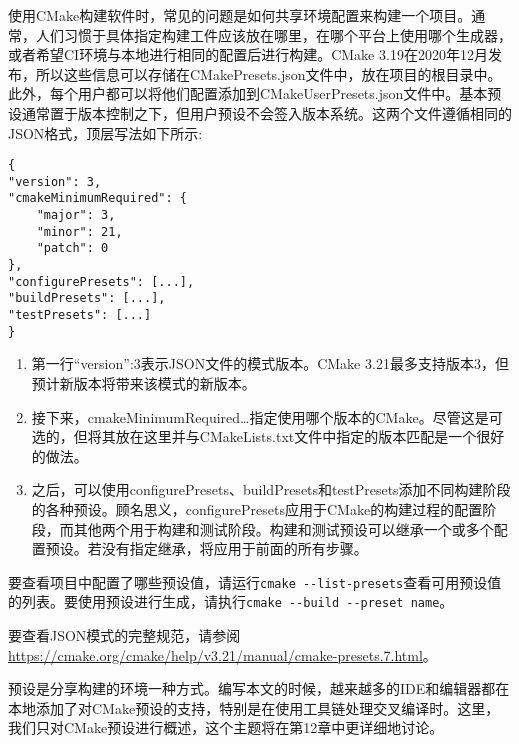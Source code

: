 使用CMake构建软件时，常见的问题是如何共享环境配置来构建一个项目。通常，人们习惯于具体指定构建工件应该放在哪里，在哪个平台上使用哪个生成器，或者希望CI环境与本地进行相同的配置后进行构建。CMake 3.19在2020年12月发布，所以这些信息可以存储在CMakePresets.json文件中，放在项目的根目录中。此外，每个用户都可以将他们配置添加到CMakeUserPresets.json文件中。基本预设通常置于版本控制之下，但用户预设不会签入版本系统。这两个文件遵循相同的JSON格式，顶层写法如下所示:

\begin{lstlisting}[style=styleCMake]
{
"version": 3,
"cmakeMinimumRequired": {
	"major": 3,
	"minor": 21,
	"patch": 0
},
"configurePresets": [...],
"buildPresets": [...],
"testPresets": [...]
}
\end{lstlisting}

\begin{enumerate}
\item 
第一行“version”:3表示JSON文件的模式版本。CMake 3.21最多支持版本3，但预计新版本将带来该模式的新版本。

\item 
接下来，cmakeMinimumRequired{…}指定使用哪个版本的CMake。尽管这是可选的，但将其放在这里并与CMakeLists.txt文件中指定的版本匹配是一个很好的做法。

\item 
之后，可以使用configurePresets、buildPresets和testPresets添加不同构建阶段的各种预设。顾名思义，configurePresets应用于CMake的构建过程的配置阶段，而其他两个用于构建和测试阶段。构建和测试预设可以继承一个或多个配置预设。若没有指定继承，将应用于前面的所有步骤。
\end{enumerate}

要查看项目中配置了哪些预设值，请运行\texttt{cmake -{}-list-presets}查看可用预设值的列表。要使用预设进行生成，请执行\texttt{cmake -{}-build -{}-preset name}。

要查看JSON模式的完整规范，请参阅\url{https://cmake.org/cmake/help/v3.21/manual/cmake-presets.7.html}。

预设是分享构建的环境一种方式。编写本文的时候，越来越多的IDE和编辑器都在本地添加了对CMake预设的支持，特别是在使用工具链处理交叉编译时。这里，我们只对CMake预设进行概述，这个主题将在第12章中更详细地讨论。









































